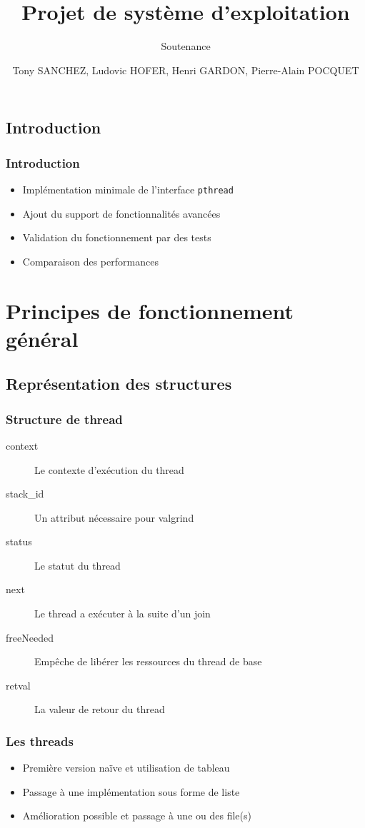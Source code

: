 \documentclass{beamer}
\title{Projet de système d'exploitation}
\subtitle{Soutenance}
\author{Tony SANCHEZ, Ludovic HOFER, Henri GARDON, Pierre-Alain POCQUET}
\institute{ENSEIRB-MATMECA}
\begin{document}
 
\maketitle

\tableofcontents
 
\begin{frame}
\section{Introduction}
\frametitle{Introduction}

\begin{itemize}
\item Implémentation minimale de l'interface \verb!pthread!
\item Ajout du support de fonctionnalités avancées
\item Validation du fonctionnement par des tests
\item Comparaison des performances
\end{itemize}
 
\end{frame}

\section{Principes de fonctionnement général}
\subsection{Représentation des structures}

\begin{frame}
\frametitle{Structure de thread}
 
\begin{description}
	\item[context] Le contexte d'exécution du thread
	\item[stack\_id] Un attribut nécessaire pour valgrind
	\item[status] Le statut du thread
	\item[next] Le thread a exécuter à la suite d'un join
	\item[freeNeeded] Empêche de libérer les ressources du thread de base
	\item[retval] La valeur de retour du thread
\end{description}
 
\end{frame}

\begin{frame}
\frametitle{Les threads}

\begin{itemize}
\item Première version naïve et utilisation de tableau
\item Passage à une implémentation sous forme de liste
\item Amélioration possible et passage à une ou des file(s)
	
\end{itemize}
 
\end{frame}
\end{document}
